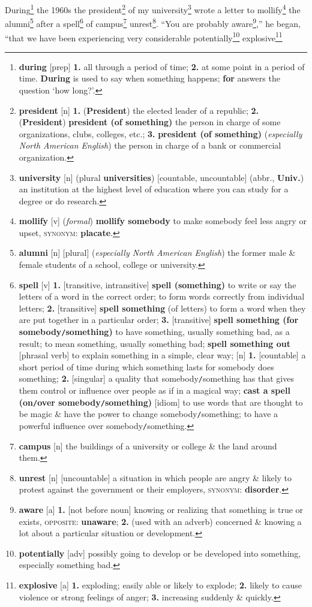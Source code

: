 \documentclass[oneside]{book}
\numberwithin{equation}{section}
\begin{document}
During\footnote{\textbf{during} [prep] \textbf{1.} all through a period of time; \textbf{2.} at some point in a period of time. \textbf{During} is used to say when something happens; \textbf{for} answers the question `how long?'.} the 1960s the president\footnote{\textbf{president} [n] \textbf{1.} (\textbf{President}) the elected leader of a republic; \textbf{2.} (\textbf{President}) \textbf{president (of something)} the person in charge of some organizations, clubs, colleges, etc.; \textbf{3.} \textbf{president (of something)} (\textit{especially North American English}) the person in charge of a bank or commercial organization.} of my university\footnote{\textbf{university} [n] (plural \textbf{universities}) [countable, uncountable] (abbr., \textbf{Univ.}) an institution at the highest level of education where you can study for a degree or do research.} wrote a letter to mollify\footnote{\textbf{mollify} [v] (\textit{formal}) \textbf{mollify somebody} to make somebody feel less angry or upset, \textsc{synonym}: \textbf{placate}.} the alumni\footnote{\textbf{alumni} [n] [plural] (\textit{especially North American English}) the former male \& female students of a school, college or university.} after a spell\footnote{\textbf{spell} [v] \textbf{1.} [transitive, intransitive] \textbf{spell (something)} to write or say the letters of a word in the correct order; to form words correctly from individual letters; \textbf{2.} [transitive] \textbf{spell something} (of letters) to form a word when they are put together in a particular order; \textbf{3.} [transitive] \textbf{spell something (for somebody\texttt{/}something)} to have something, usually something bad, as a result; to mean something, usually something bad; \textbf{spell something out} [phrasal verb] to explain something in a simple, clear way; [n] \textbf{1.} [countable] a short period of time during which something lasts for somebody does something; \textbf{2.} [singular] a quality that somebody\texttt{/}something has that gives them control or influence over people as if in a magical way; \textbf{cast a spell (on\texttt{/}over somebody\texttt{/}something)} [idiom] to use words that are thought to be magic \& have the power to change somebody\texttt{/}something; to have a powerful influence over somebody\texttt{/}something.} of campus\footnote{\textbf{campus} [n] the buildings of a university or college \& the land around them.} unrest\footnote{\textbf{unrest} [n] [uncountable] a situation in which people are angry \& likely to protest against the government or their employers, \textsc{synonym}: \textbf{disorder}.}. ``You are probably aware\footnote{\textbf{aware} [a] \textbf{1.} [not before noun] knowing or realizing that something is true or exists, \textsc{opposite}: \textbf{unaware}; \textbf{2.} (used with an adverb) concerned \& knowing a lot about a particular situation or development.},'' he began, ``that we have been experiencing very considerable potentially\footnote{\textbf{potentially} [adv] possibly going to develop or be developed into something, especially something bad.} explosive\footnote{\textbf{explosive} [a] \textbf{1.} exploding; easily able or likely to explode; \textbf{2.} likely to cause violence or strong feelings of anger; \textbf{3.} increasing suddenly \& quickly.} 
\end{document}
